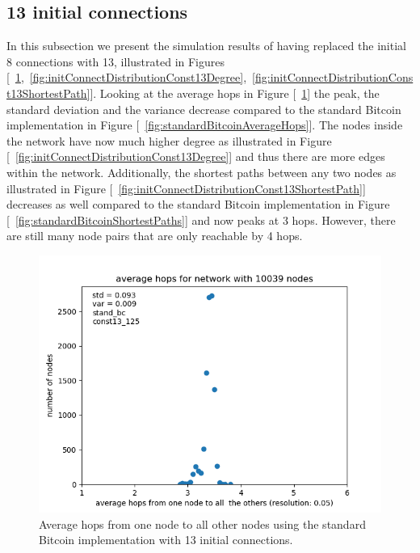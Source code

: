 \documentclass[a4paper, oneside]{discothesis}
\begin{document}
\subsection{13 initial connections}

In this subsection we present the simulation results of having replaced the initial 8 connections with 13, illustrated in Figures [~\ref{fig:initConnectDistributionConst13Average},~\ref{fig:initConnectDistributionConst13Degree},~\ref{fig:initConnectDistributionConst13ShortestPath}].
Looking at the average hops in Figure [~\ref{fig:initConnectDistributionConst13Average}] the peak, the standard deviation and the variance decrease compared to the standard Bitcoin implementation in Figure [~\ref{fig:standardBitcoinAverageHops}]. The nodes inside the network have now much higher degree as illustrated in Figure [~\ref{fig:initConnectDistributionConst13Degree}] and thus there are more edges within the network. Additionally, the shortest paths between any two nodes as illustrated in Figure [~\ref{fig:initConnectDistributionConst13ShortestPath}] decreases as well compared to the standard Bitcoin implementation in Figure [~\ref{fig:standardBitcoinShortestPaths}] and now peaks at 3 hops. However, there are still many node pairs that are only reachable by 4 hops.

\begin{figure}
    \centering
    \includegraphics[width=.8\columnwidth]{figures/initConnectDistribution/const13/average-hops-for-network-with-10039-nodes.png}
    \caption{Average hops from one node to all other nodes using the standard Bitcoin implementation with 13 initial connections.}
    \label{fig:initConnectDistributionConst13Average}
\end{figure}
\end{document}
